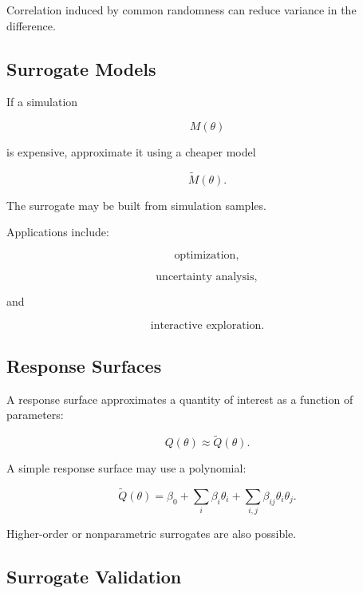 Correlation induced by common randomness can reduce variance in the
difference.

\subsection{Surrogate Models}
\label{subsec:simulation-surrogate-models}

If a simulation

\[
M(\theta)
\]

is expensive, approximate it using a cheaper model

\[
\boxed{
\widetilde{M}(\theta).
}
\]

The surrogate may be built from simulation samples.

Applications include:

\[
\boxed{
\text{optimization},
}
\]

\[
\boxed{
\text{uncertainty analysis},
}
\]

and

\[
\boxed{
\text{interactive exploration}.
}
\]

\subsection{Response Surfaces}
\label{subsec:response-surfaces}

A response surface approximates a quantity of interest as a function of
parameters:

\[
\boxed{
Q(\theta)
\approx
\widetilde{Q}(\theta).
}
\]

A simple response surface may use a polynomial:

\[
\boxed{
\widetilde{Q}(\theta)
=
\beta_0
+
\sum_i
\beta_i\theta_i
+
\sum_{i,j}
\beta_{ij}\theta_i\theta_j.
}
\]

Higher-order or nonparametric surrogates are also possible.

\subsection{Surrogate Validation}
\label{subsec:surrogate-validation}

